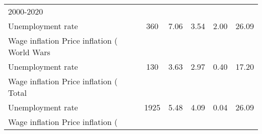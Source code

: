 \begin{table}[htbp]
\begin{tabular}{l*{1}{ccccc}}
\hline
2000-2020           &            &            &            &            &            \\
Unemployment rate   &         360&        7.06&        3.54&        2.00&       26.09\\
Wage inflation %
Price inflation (%
\hline
World Wars          &            &            &            &            &            \\
Unemployment rate   &         130&        3.63&        2.97&        0.40&       17.20\\
Wage inflation %
Price inflation (%
\hline
Total               &            &            &            &            &            \\
Unemployment rate   &        1925&        5.48&        4.09&        0.04&       26.09\\
Wage inflation %
Price inflation (%
\hline\hline
\end{tabular}
\end{table}
